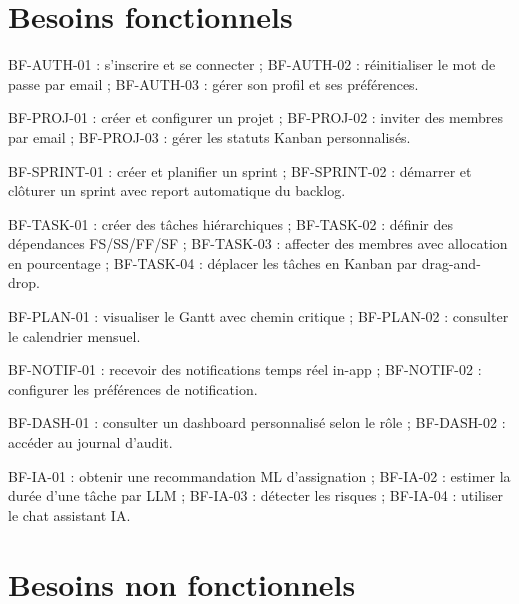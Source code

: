 \section{Besoins fonctionnels}

\begin{description}[leftmargin=1.5cm]
  \item[\textbf{AUTH}] BF-AUTH-01 : s'inscrire et se connecter ; BF-AUTH-02 :
        réinitialiser le mot de passe par email ; BF-AUTH-03 : gérer son profil
        et ses préférences.
  \item[\textbf{PROJ}] BF-PROJ-01 : créer et configurer un projet ; BF-PROJ-02 :
        inviter des membres par email ; BF-PROJ-03 : gérer les statuts Kanban
        personnalisés.
  \item[\textbf{SPRINT}] BF-SPRINT-01 : créer et planifier un sprint ; BF-SPRINT-02 :
        démarrer et clôturer un sprint avec report automatique du backlog.
  \item[\textbf{TASK}] BF-TASK-01 : créer des tâches hiérarchiques ; BF-TASK-02 :
        définir des dépendances FS/SS/FF/SF ; BF-TASK-03 : affecter des membres
        avec allocation en pourcentage ; BF-TASK-04 : déplacer les tâches en
        Kanban par drag-and-drop.
  \item[\textbf{PLAN}] BF-PLAN-01 : visualiser le Gantt avec chemin critique ;
        BF-PLAN-02 : consulter le calendrier mensuel.
  \item[\textbf{NOTIF}] BF-NOTIF-01 : recevoir des notifications temps réel
        in-app ; BF-NOTIF-02 : configurer les préférences de notification.
  \item[\textbf{DASH}] BF-DASH-01 : consulter un dashboard personnalisé selon le
        rôle ; BF-DASH-02 : accéder au journal d'audit.
  \item[\textbf{IA}] BF-IA-01 : obtenir une recommandation ML d'assignation ;
        BF-IA-02 : estimer la durée d'une tâche par LLM ; BF-IA-03 : détecter
        les risques ; BF-IA-04 : utiliser le chat assistant IA.
\end{description}

\section{Besoins non fonctionnels}

